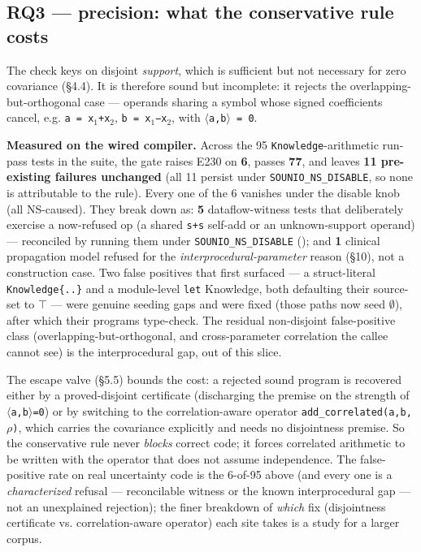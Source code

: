 \documentclass[sigplan,review,anonymous,10pt]{acmart}
\begin{document}
\subsection{RQ3 --- precision: what the conservative rule costs}

The check keys on disjoint \emph{support}, which is sufficient but not necessary for zero covariance (§4.4). It is therefore sound but incomplete: it rejects the overlapping-but-orthogonal case --- operands sharing a symbol whose signed coefficients cancel, e.g. \texttt{a = x$_{1}$+x$_{2}$}, \texttt{b = x$_{1}$−x$_{2}$}, with \texttt{$\langle$a,b$\rangle$ = 0}.

\textbf{Measured on the wired compiler.} Across the 95 \texttt{Knowledge}-arithmetic run-pass tests in the suite, the gate raises E230 on \textbf{6}, passes \textbf{77}, and leaves \textbf{11 pre-existing failures unchanged} (all 11 persist under \texttt{SOUNIO\_NS\_DISABLE}, so none is attributable to the rule). Every one of the 6 vanishes under the disable knob (all NS-caused). They break down as: \textbf{5} dataflow-witness tests that deliberately exercise a now-refused op (a shared \texttt{s+s} self-add or an unknown-support operand) --- reconciled by running them under \texttt{SOUNIO\_NS\_DISABLE} (); and \textbf{1} clinical propagation model refused for the \emph{interprocedural-parameter} reason (§10), not a construction case. Two false positives that first surfaced --- a struct-literal \texttt{Knowledge\{..\}} and a module-level \texttt{let} Knowledge, both defaulting their source-set to \texttt{$\top$} --- were genuine seeding gaps and were fixed (those paths now seed \texttt{$\emptyset$}), after which their programs type-check. The residual non-disjoint false-positive class (overlapping-but-orthogonal, and cross-parameter correlation the callee cannot see) is the interprocedural gap, out of this slice.

The escape valve (§5.5) bounds the cost: a rejected sound program is recovered either by a proved-disjoint certificate (discharging the premise on the strength of \texttt{$\langle$a,b$\rangle$=0}) or by switching to the correlation-aware operator \texttt{add\_correlated(a,b,$\rho$)}, which carries the covariance explicitly and needs no disjointness premise. So the conservative rule never \emph{blocks} correct code; it forces correlated arithmetic to be written with the operator that does not assume independence. The false-positive rate on real uncertainty code is the 6-of-95 above (and every one is a \emph{characterized} refusal --- reconcilable witness or the known interprocedural gap --- not an unexplained rejection); the finer breakdown of \emph{which} fix (disjointness certificate vs. correlation-aware operator) each site takes is a study for a larger corpus.
\end{document}

